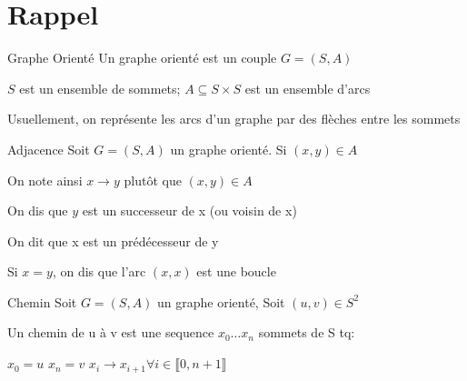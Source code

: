 \documentclass[a4paper,french,bookmarks]{article}
\begin{document}
    \renewcommand{\thesection}{\Roman{section}} 
    \renewcommand{\thesubsection}{\thesection.\Alph{subsection}}
    \renewcommand{\labelenumi}{\thesection.\arabic{enumi}.}
    \renewcommand*{\labelenumii}{\alph{enumii}.}
    \renewcommand*{\labelenumiii}{\alph{enumiii}.}
    
    \def\authorvar{DRISSI Rayan}

    \section{Rappel}

    
    \begin{definition}{Graphe Orienté}{}
        Un graphe orienté est un couple $G = (S, A)$
        
        \begin{enumerate}
            \itt $S$ est un ensemble de sommets;
            \itt $A \subseteq S \times S$ est un ensemble d'arcs 
        \end{enumerate}
        Usuellement, on représente les arcs d'un graphe par des flèches entre les sommets 
    \end{definition}
    
    \begin{definition}{Adjacence}{}
        Soit $G = (S, A)$ un graphe orienté. 
        Si $(x,y) \in A $
        \begin{enumerate}
            \itt On note ainsi $x \to y $ plutôt que $(x,y) \in A$
            
            \itt On dis que $y$ est un successeur de x (ou voisin de x)
            
            \itt On dit que x est un prédécesseur de y
            
            \itt Si $x=y$, on dis que l'arc $(x,x)$ est une boucle 
        

        \end{enumerate}
    
    \end{definition}
    
    \begin{definition}{Chemin}
        Soit $G = (S, A)$ un graphe orienté,
        Soit $(u,v) \in S^2$
        
        Un chemin de u à v est une sequence $x_0 \dots x_n$ sommets de S tq:
        \begin{enumerate}
            \itt $x_0 = u$
            \itt $x_n = v$
            \itt $x_i \to x_{i+1} \forall i \in \llbracket 0, n+1 \rrbracket$
        \end{enumerate}
        
    \end{definition}
    
\end{document}
